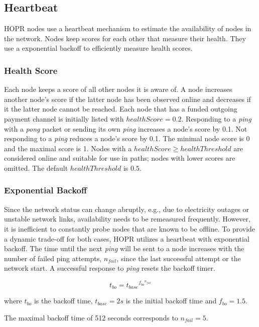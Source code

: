 \subsection{Heartbeat}
HOPR nodes use a heartbeat mechanism to estimate the availability of nodes in the network. Nodes keep scores for each other that measure their health. They use a exponential backoff to efficiently measure health scores.

\subsubsection{Health Score}
Each node keeps a score of all other nodes it is aware of. A node increases another node's score if the latter node has been observed online and decreases if it the latter node cannot be reached. Each node that has a funded outgoing payment channel is initially listed with $healthScore = 0.2$. Responding to a \textit{ping} with a \textit{pong} packet or sending its own \textit{ping} increases a node's score by 0.1. Not responding to a \textit{ping} reduces a node's score by 0.1. The minimal node score is 0 and the maximal score is 1. Nodes with a $healthScore \ge healthThreshold$ are considered online and suitable for use in paths; nodes with lower scores are omitted. The default $healthThreshold$ is $0.5$.

\subsubsection{Exponential Backoff}
Since the network status can change abruptly, e.g., due to electricity outages or unstable network links, availability needs to be remeasured frequently. However, it is inefficient to constantly probe nodes that are known to be offline. To provide a dynamic trade-off for both cases, HOPR utilizes a heartbeat with exponential backoff. The time until the next \textit{ping} will be sent to a node increases with the number of failed ping attempts, $n_{fail}$, since the last successful attempt or the network start. A successful response to \textit{ping} resets the backoff timer.

$$ t_{bo} = {t_{base}}^{{f_{bo}}^{n_{fail}}} $$

where $t_{bo}$ is the backoff time, $t_{base} = 2s$ is the initial backoff time and $f_{bo} = 1.5$.

The maximal backoff time of 512 seconds corresponds to $n_{fail} = 5$.